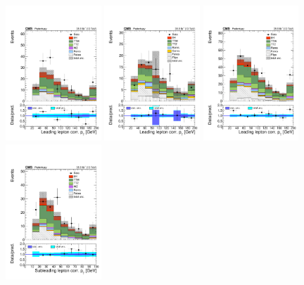 \begin{figure}[htb]
	\centering 
\includegraphics[width=0.32\textwidth]{plots_leptons/lep_evtsel/2lss_SR/mm/kinMVA_input_LepGood0_conePt.pdf}
\includegraphics[width=0.32\textwidth]{plots_leptons/lep_evtsel/2lss_SR/ee/kinMVA_input_LepGood0_conePt.pdf}
\includegraphics[width=0.32\textwidth]{plots_leptons/lep_evtsel/2lss_SR/em/kinMVA_input_LepGood0_conePt.pdf}
\includegraphics[width=0.32\textwidth]{plots_leptons/lep_evtsel/2lss_SR/mm/kinMVA_input_LepGood1_conePt.pdf}

\end{figure}
